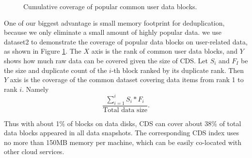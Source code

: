  
\begin{figure}
\centering
{}

\caption{Cumulative  coverage of popular common user data blocks.}
\label{fig:userdatacoverage}
\end{figure}

One of our biggest advantage is small memory footprint for deduplication, because we only
eliminate a small amount of highly popular data.
we use dataset2 to demonstrate the coverage of popular data blocks on user-related data, 
as shown in Figure \ref{fig:userdatacoverage}.
The $X$ axis is the rank of common user data blocks, and $Y$ shows how much raw data can be covered given
the size of CDS.
Let $S_i$ and $F_I$ be the size and duplicate count 
of the $i$-th block ranked by its duplicate rank.  Then $Y$ axis is the coverage of
the common dataset covering data items from rank 1 to rank $i$. Namely  
\[
\frac{ \sum_{i=1}^{i} S_i * F_i} {\mbox{Total data size}}.
\]

Thus with about 1\% of blocks on data disks, CDS can cover about 38\% of total data blocks
appeared in all data snapshots. The corresponding CDS index uses no more than 150MB memory per machine,
which can be easily co-located with other cloud services.






